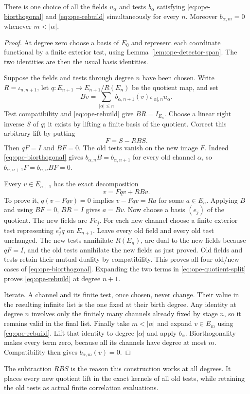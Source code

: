 \begin{proposition}\label{prop:ope-prescription}
There is one choice of all the fields $u_\alpha$ and tests $b_\alpha$
satisfying \eqref{eq:ope-biorthogonal} and \eqref{eq:ope-rebuild}
simultaneously for every $n$. Moreover
$b_{\alpha,m}=0$ whenever $m<|\alpha|$.
\end{proposition}
\begin{proof}
At degree zero choose a basis of $E_0$ and represent each coordinate
functional by a finite exterior test, using
Lemma~\ref{lem:ope-detector-span}. The two identities are then the usual
basis identities.

Suppose the fields and tests through degree $n$ have been chosen.
Write $R=\iota_{n,n+1}$, let $q:E_{n+1}\to E_{n+1}/R(E_n)$ be the
quotient map, and set
\[
 Bv=\sum_{|\alpha|\leq n}b_{\alpha,n+1}(v)
                           \iota_{|\alpha|,n}u_\alpha.
\]
Test compatibility and \eqref{eq:ope-rebuild} give $BR=I_{E_n}$.
Choose a linear right inverse $S$ of $q$; it exists by lifting a finite
basis of the quotient. Correct this arbitrary lift by putting
\[
 F=S-RBS.
\]
Then $qF=I$ and $BF=0$. The old tests vanish on the new image $F$.
Indeed \eqref{eq:ope-biorthogonal} gives
$b_{\alpha,n}B=b_{\alpha,n+1}$ for every old channel $\alpha$, so
$b_{\alpha,n+1}F=b_{\alpha,n}BF=0$.

Every $v\in E_{n+1}$ has the exact decomposition
\begin{equation}\label{eq:ope-quotient-split}
 v=Fqv+RBv.
\end{equation}
To prove it, $q(v-Fqv)=0$ implies $v-Fqv=Ra$ for some $a\in E_n$.
Applying $B$ and using $BF=0$, $BR=I$ gives $a=Bv$.
Now choose a basis $(e_j)$ of the quotient. The new fields are $Fe_j$.
For each new channel choose a finite exterior test representing
$e_j^*q$ on $E_{n+1}$. Leave every old field and every old test unchanged.
The new tests annihilate $R(E_n)$, are dual to the new fields because
$qF=I$, and the old tests annihilate the new fields as just proved.
Old fields and tests retain their mutual duality by compatibility.
This proves all four old/new cases of \eqref{eq:ope-biorthogonal}.
Expanding the two terms in \eqref{eq:ope-quotient-split} proves
\eqref{eq:ope-rebuild} at degree $n+1$.

Iterate. A channel and its finite test, once chosen, never change.
Their value in the resulting infinite list is the one fixed at their birth
degree. Any identity at degree $n$ involves only the finitely many channels
already fixed by stage $n$, so it remains valid in the final list.
Finally take $m<|\alpha|$ and expand $v\in E_m$ using
\eqref{eq:ope-rebuild}. Lift that identity to degree $|\alpha|$ and apply
$b_\alpha$. Biorthogonality makes every term zero, because all its
channels have degree at most $m$. Compatibility then gives
$b_{\alpha,m}(v)=0$.
\end{proof}
The subtraction $RBS$ is the reason this construction works at all degrees.
It places every new quotient lift in the exact kernels of all old tests,
while retaining the old tests as actual finite correlation evaluations.

